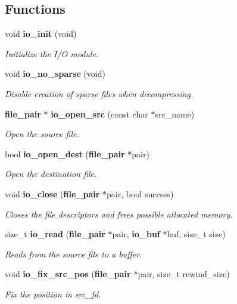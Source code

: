 \subsection*{Functions}
\begin{DoxyCompactItemize}
\item 
void {\bf io\-\_\-init} (void)
\begin{DoxyCompactList}\small\item\em Initialize the I/\-O module. \end{DoxyCompactList}\item 
void {\bf io\-\_\-no\-\_\-sparse} (void)
\begin{DoxyCompactList}\small\item\em Disable creation of sparse files when decompressing. \end{DoxyCompactList}\item 
{\bf file\-\_\-pair} $\ast$ {\bf io\-\_\-open\-\_\-src} (const char $\ast$src\-\_\-name)
\begin{DoxyCompactList}\small\item\em Open the source file. \end{DoxyCompactList}\item 
bool {\bf io\-\_\-open\-\_\-dest} ({\bf file\-\_\-pair} $\ast$pair)
\begin{DoxyCompactList}\small\item\em Open the destination file. \end{DoxyCompactList}\item 
void {\bf io\-\_\-close} ({\bf file\-\_\-pair} $\ast$pair, bool success)
\begin{DoxyCompactList}\small\item\em Closes the file descriptors and frees possible allocated memory. \end{DoxyCompactList}\item 
size\-\_\-t {\bf io\-\_\-read} ({\bf file\-\_\-pair} $\ast$pair, {\bf io\-\_\-buf} $\ast$buf, size\-\_\-t size)
\begin{DoxyCompactList}\small\item\em Reads from the source file to a buffer. \end{DoxyCompactList}\item 
void {\bf io\-\_\-fix\-\_\-src\-\_\-pos} ({\bf file\-\_\-pair} $\ast$pair, size\-\_\-t rewind\-\_\-size)
\begin{DoxyCompactList}\small\item\em Fix the position in src\-\_\-fd. \end{DoxyCompactList}\item 

\end{DoxyCompactItemize}
